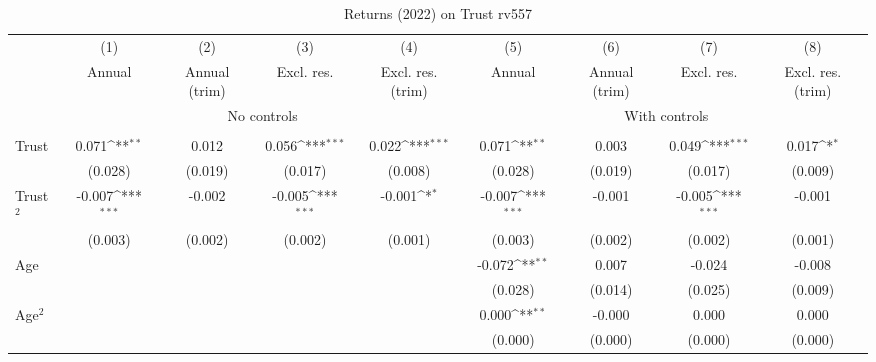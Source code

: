 \begin{table}[htbp]\centering
\def\sym#1{\ifmmode^{#1}\else\(^{#1}\)\fi}
\caption{Returns (2022) on Trust rv557}
\begin{tabular}{l*{8}{c}}
\toprule
          &\multicolumn{1}{c}{(1)}&\multicolumn{1}{c}{(2)}&\multicolumn{1}{c}{(3)}&\multicolumn{1}{c}{(4)}&\multicolumn{1}{c}{(5)}&\multicolumn{1}{c}{(6)}&\multicolumn{1}{c}{(7)}&\multicolumn{1}{c}{(8)}\\
          &\multicolumn{1}{c}{Annual}&\multicolumn{1}{c}{Annual (trim)}&\multicolumn{1}{c}{Excl. res.}&\multicolumn{1}{c}{Excl. res. (trim)}&\multicolumn{1}{c}{Annual}&\multicolumn{1}{c}{Annual (trim)}&\multicolumn{1}{c}{Excl. res.}&\multicolumn{1}{c}{Excl. res. (trim)}\\
& \multicolumn{4}{c}{No controls} & \multicolumn{4}{c}{With controls} \\\\ \cmidrule(lr){2-5}\cmidrule(lr){6-9}
Trust     &    0.071\sym{**} &    0.012         &    0.056\sym{***}&    0.022\sym{***}&    0.071\sym{**} &    0.003         &    0.049\sym{***}&    0.017\sym{*}  \\
          &  (0.028)         &  (0.019)         &  (0.017)         &  (0.008)         &  (0.028)         &  (0.019)         &  (0.017)         &  (0.009)         \\
Trust$^{2}$&   -0.007\sym{***}&   -0.002         &   -0.005\sym{***}&   -0.001\sym{*}  &   -0.007\sym{***}&   -0.001         &   -0.005\sym{***}&   -0.001         \\
          &  (0.003)         &  (0.002)         &  (0.002)         &  (0.001)         &  (0.003)         &  (0.002)         &  (0.002)         &  (0.001)         \\
Age       &                  &                  &                  &                  &   -0.072\sym{**} &    0.007         &   -0.024         &   -0.008         \\
          &                  &                  &                  &                  &  (0.028)         &  (0.014)         &  (0.025)         &  (0.009)         \\
Age$^{2}$ &                  &                  &                  &                  &    0.000\sym{**} &   -0.000         &    0.000         &    0.000         \\
          &                  &                  &                  &                  &  (0.000)         &  (0.000)         &  (0.000)         &  (0.000)         \\

\end{tabular}
\end{table}
